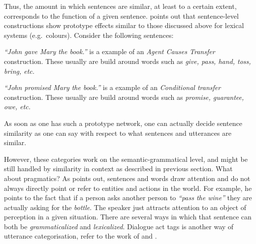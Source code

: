 \documentclass[11pt]{article}
\begin{document}
Thus, the amount in which sentences are similar, at least to a certain extent, corresponds to the function of a given sentence.  points out that sentence-level constructions show prototype effects similar to those discussed above for lexical systems (e.g.~colours). Consider the following sentences:
\begin{compactitem}
    \item \textit{``John gave Mary the book.''} is a example of an \emph{Agent Causes Transfer} construction. These usually are build around words such as \textit{give, pass, hand, toss, bring, etc.}
      \item \textit{``John promised Mary the book.''} is a example of an \emph{Conditional transfer} construction. These usually are build around words such as \textit{promise, guarantee, owe, etc.}
\end{compactitem}
As soon as one has such a prototype network, one can actually decide sentence similarity as one can say with respect to what sentences and utterances are similar. 

However, these categories work on the semantic-grammatical level, and might be still handled by similarity in context as described in previous section. What about pragmatics? As  points out, sentences and words draw attention and do not always directly point or refer to entities and actions in the world. For example, he points to the fact that if a person asks another person to \textit{``pass the wine''} they are actually asking for the \textit{bottle}. The speaker just attracts attention to an object of perception in a given situation. There are several ways in which that sentence can both be \emph{grammaticalized} and \emph{lexicalized}. Dialogue act tags is another way of utterance categorisation, refer to the work of  and .
\end{document}
